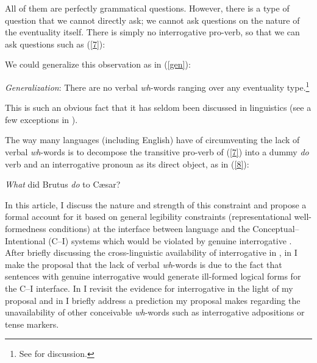 \documentclass[output=paper]{langsci/langscibook}
\begin{document}
All of them are perfectly grammatical questions. However, there is a type of
question that we cannot directly ask; we cannot ask questions on the nature of
the eventuality itself. There is simply no interrogative pro-verb, so that we
can ask questions such as (\ref{7}):

\label{7}
\z

We could generalize this observation as in (\ref{gen}):

\ea
\label{gen}
\emph{Generalization}: There are no verbal \emph{wh}-words ranging over any
eventuality type.\footnote{See  for discussion.}
\z

This is such an obvious fact that it has seldom been discussed in linguistics
(see a few exceptions in
\citealt{hagege2003,hagege2008,cysouw2004,idiatov.vanderauwera2004}).

The way many languages (including English) have of circumventing the lack of
verbal \emph{wh}-words is to decompose the transitive pro-verb of (\ref{7})
into a dummy \emph{do} verb and an interrogative pronoun as its direct
object, as in (\ref{8}):\largerpage[1]

\ea
\label{8} \emph{What} did Brutus \emph{do} to C\ae{}sar?
\z

In this article, I discuss the nature and strength of this constraint and
propose a formal account for it based on general legibility constraints
(representational well-formedness conditions) at the interface between language
and the Conceptual--Intentional (C--I) systems which would be violated by genuine
interrogative . After briefly discussing the cross-linguistic
availability of interrogative  in , in  I make
the proposal that the lack of verbal \emph{wh}-words is due to the fact that
sentences with genuine interrogative  would generate ill-formed
logical forms for the C--I interface. In  I revisit the
evidence for interrogative  in the light of my proposal and in
 I briefly address a prediction my proposal makes
regarding the unavailability of other conceivable \emph{wh}-words such as
interrogative adpositions or tense markers.\largerpage[-1]
\end{document}
